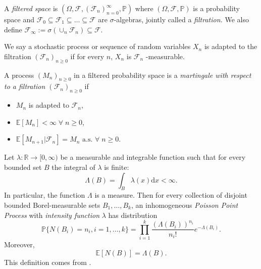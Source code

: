 \begin{definition}
    A \emph{filtered space} is $(\Omega,\mathcal{F},(\mathcal{F}_n)_{n=0}^\infty,\mathbb{P})$
    where $(\Omega,\mathcal{F},\mathbb{P})$ is a probability space and 
    $\mathcal{F}_0\subseteq\mathcal{F}_1\subseteq\dots\subseteq\mathcal{F}$
    are $\sigma$-algebras, jointly called a \emph{filtration.} We also define
    $\mathcal{F}_\infty:=\sigma(\cup_n\mathcal{F}_n)\subseteq\mathcal{F}.$ 
    
    We say a stochastic process or sequence of random variables $X_n$ is adapted to
    the filtration $(\mathcal{F}_n)_{n\geq0}$ if for every $n$, $X_n$ is $\mathcal{F}_n$
    -measurable. 
\end{definition}

\begin{definition}[Martingales]
    A process $(M_n)_{n\geq0}$ in a filtered probability space is a
    \emph{martingale with respect to a filtration $(\mathcal{F}_n)_{n\geq0}$}
    if
    \begin{itemize}
        \item $M_n$ is adapted to $\mathcal{F}_n$,
        \item $\mathbb{E}[M_n]<\infty\;\forall\;n\geq0$,
        \item $\mathbb{E}[M_{n+1}|\mathcal{F}_n]=M_n\textrm{ a.s. }\forall\;n\geq0.$
    \end{itemize}
\end{definition}

\begin{definition}
    Let $\lambda:\mathbb{R}\rightarrow[0,\infty)$ be a measurable and
    integrable function such that for every bounded set $B$ the integral of 
    $\lambda$ is finite:
    \begin{equation}
        \Lambda(B)=\int_B\lambda(x)\mathrm dx<\infty.
    \end{equation}
    In particular, the function $\Lambda$ is a measure.
    Then for every collection of disjoint bounded Borel-measurable sets
    $B_1,\dots,B_k$, an inhomogeneous \emph{Poisson Point Process} with
    \emph{intensity function} $\lambda$ has distribution
    \begin{equation}
        \mathbb{P}\{N(B_i)=n_i,i=1,\dots,k\}=\prod_{i=1}^k\frac{(\Lambda(B_i))^{n_i}}{n_i!}e^{-\Lambda(B_i)}.
    \end{equation}
    Moreover,
    \begin{equation}
        \mathbb{E}[N(B)]=\Lambda(B).
    \end{equation}
    This definition comes from \textcite{PointTheory}.
\end{definition}

